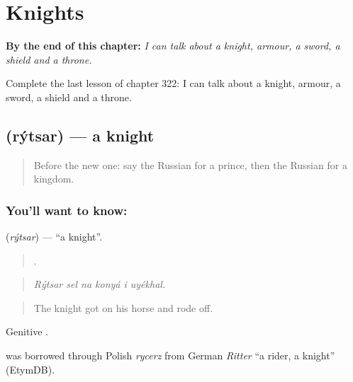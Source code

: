
\chapter{Knights}
\label{ch:ru-knights}

\begin{chapteropening}
\textbf{By the end of this chapter:} \emph{I can talk about a knight, armour, a sword, a shield and a throne.}

Complete the last lesson of chapter 322: I can talk about a knight, armour, a sword, a shield and a throne.
\end{chapteropening}

\section[\texorpdfstring{\ru{рыцарь} (rýtsar)}{рыцарь (rýtsar)}]{ (rýtsar) — a knight}

\label{lesson:RU-C322-rytsar}



\begin{quote}
Before the new one: say the Russian for a prince, then the Russian for a kingdom.
\end{quote}

\subsection*{You'll want to know: }
\textbf{} (\emph{rýtsar}) — \textquotedblleft{}a knight\textquotedblright{}.

\begin{quote}
     .
\end{quote}

\begin{quote}
\emph{Rýtsar sel na konyá i uyékhal.}
\end{quote}

\begin{quote}
The knight got on his horse and rode off.
\end{quote}

Genitive \emph{}.

\begin{cousinweb}
\emph{} was borrowed through Polish \emph{rycerz} from German \emph{Ritter} \textquotedblleft{}a rider, a knight\textquotedblright{} (EtymDB).
\end{cousinweb}

